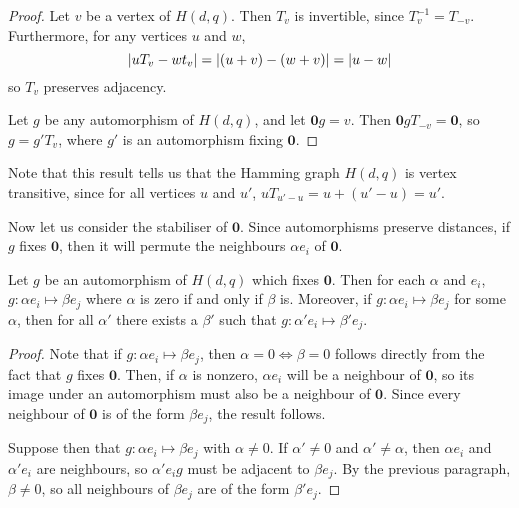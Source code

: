 \documentclass{report}
\newcommand{\wt}[1]{\abs{ #1 }}
\newcommand{\vzero}{\mathbf{0}}
\begin{document}
    \begin{proof}
      Let $v$ be a vertex of $H(d, q)$.  Then $T_v$ is invertible, since
      $T_v^{-1} = T_{-v}$.  Furthermore, for any vertices $u$ and $w$,
      $$
        \wt{uT_v - wt_v}
        = \wt{(u + v) - (w + v)}
        = \wt{u - w}
      $$
      so $T_v$ preserves adjacency.

      Let $g$ be any automorphism of $H(d, q)$, and let $\vzero g = v$.  Then 
      $\vzero g T_{-v} = \vzero$, so $g = g' T_v$, where $g'$ is an automorphism
      fixing $\vzero$.
    \end{proof}

    Note that this result tells us that the Hamming graph $H(d, q)$ is vertex
    transitive, since for all vertices $u$ and $u'$, $u T_{u' - u} = u + (u' -
    u) = u'$.

    Now let us consider the stabiliser of $\vzero$.  Since automorphisms
    preserve distances, if $g$ fixes $\vzero$, then it will permute the
    neighbours $\alpha e_i$ of $\vzero$.

    \begin{lem}\label{lem:hamming-automorphisms-preserve-component}
      Let $g$ be an automorphism  of $H(d, q)$ which fixes $\vzero$.  Then for
      each $\alpha$ and $e_i$, $g: \alpha e_i \mapsto \beta e_j$ where $\alpha$
      is zero if and only if $\beta$ is.
      Moreover, if $g: \alpha e_i \mapsto \beta e_j$ for some $\alpha$, then for
      all $\alpha'$ there exists a $\beta'$ such that $g: \alpha' e_i \mapsto
      \beta' e_j$.
    \end{lem}

    \begin{proof}
      Note that if $g: \alpha e_i \mapsto \beta e_j$, then $\alpha = 0 \iff \beta
      = 0$ follows directly from the fact that $g$ fixes $\vzero$.  Then, if
      $\alpha$ is nonzero, $\alpha e_i$ will be a neighbour of $\vzero$, so its
      image under an automorphism must also be a neighbour of $\vzero$.  Since
      every neighbour of $\vzero$ is of the form $\beta e_j$, the result
      follows.

      Suppose then that $g: \alpha e_i \mapsto \beta e_j$ with $\alpha \neq 0$.
      If $\alpha' \neq 0$ and $\alpha' \neq \alpha$, then $\alpha e_i$ and
      $\alpha' e_i$ are neighbours, so $\alpha' e_i g$ must be adjacent to
      $\beta e_j$.  By the previous paragraph, $\beta \neq 0$, so all neighbours
      of $\beta e_j$ are of the form $\beta' e_j$.
    \end{proof}
\end{document}
